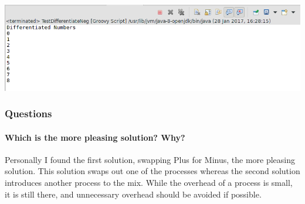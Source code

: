 \includegraphics[width=\textwidth]{img/screenshots/3-1-2.png}

\subsubsection*{Questions}

\paragraph{Which is the more pleasing solution? Why?}

Personally I found the first solution, swapping Plus for Minus, the more pleasing solution.  This solution swaps out one of the processes whereas the second solution introduces another process to the mix.  While the overhead of a process is small, it is still there, and unnecessary overhead should be avoided if possible.
